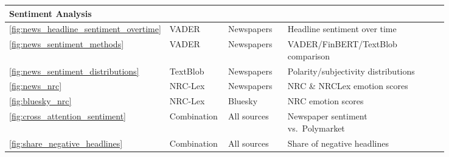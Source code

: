\begin{longtable}{|p{0.05\linewidth}|p{0.14\linewidth}|p{0.16\linewidth}|p{0.43\linewidth}|p{0.06\linewidth}|}
\multicolumn{5}{|l|}{\rule[-0.3em]{0pt}{1.2em}\textcolor{textprimary}{\sffamily\bfseries\small\enspace 5 \enspace Sentiment Analysis}} \\
\hline
\textcolor{textmuted}{\small\ref{fig:news_headline_sentiment_overtime}} & \textcolor{textmuted}{\small VADER}             & \textcolor{textmuted}{\small Newspapers}      & \textcolor{textmuted}{\small Headline sentiment over time}             & \textcolor{textmuted}{\small\pageref{fig:news_headline_sentiment_overtime}} \\\hline
\textcolor{textmuted}{\small\ref{fig:news_sentiment_methods}}      & \textcolor{textmuted}{\small VADER}             & \textcolor{textmuted}{\small Newspapers}      & \textcolor{textmuted}{\small VADER/FinBERT/TextBlob comparison}        & \textcolor{textmuted}{\small\pageref{fig:news_sentiment_methods}} \\\hline
\textcolor{textmuted}{\small\ref{fig:news_sentiment_distributions}} & \textcolor{textmuted}{\small TextBlob}          & \textcolor{textmuted}{\small Newspapers}      & \textcolor{textmuted}{\small Polarity/subjectivity distributions}      & \textcolor{textmuted}{\small\pageref{fig:news_sentiment_distributions}} \\\hline
\textcolor{textmuted}{\small\ref{fig:news_nrc}}                    & \textcolor{textmuted}{\small NRC-Lex}           & \textcolor{textmuted}{\small Newspapers}      & \textcolor{textmuted}{\small NRC \& NRCLex emotion scores}             & \textcolor{textmuted}{\small\pageref{fig:news_nrc}} \\\hline
\textcolor{textmuted}{\small\ref{fig:bluesky_nrc}}                 & \textcolor{textmuted}{\small NRC-Lex}           & \textcolor{textmuted}{\small Bluesky}         & \textcolor{textmuted}{\small NRC emotion scores}                       & \textcolor{textmuted}{\small\pageref{fig:bluesky_nrc}} \\\hline
\textcolor{textmuted}{\small\ref{fig:cross_attention_sentiment}}   & \textcolor{textmuted}{\small Combination}       & \textcolor{textmuted}{\small All sources}     & \textcolor{textmuted}{\small Newspaper sentiment vs.\ Polymarket}      & \textcolor{textmuted}{\small\pageref{fig:cross_attention_sentiment}} \\\hline
\textcolor{textmuted}{\small\ref{fig:share_negative_headlines}}    & \textcolor{textmuted}{\small Combination}       & \textcolor{textmuted}{\small All sources}     & \textcolor{textmuted}{\small Share of negative headlines}              & \textcolor{textmuted}{\small\pageref{fig:share_negative_headlines}} \\\hline


\end{longtable}
